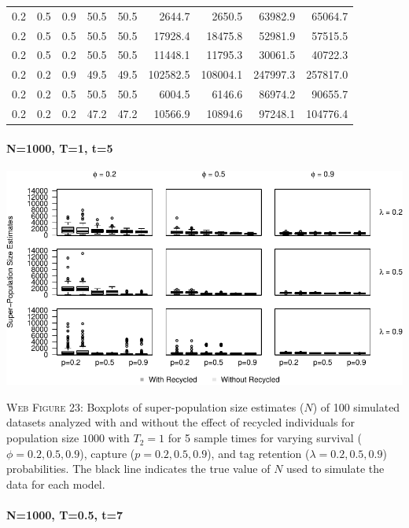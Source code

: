 \documentclass[]{article}
\let\oldparagraph\paragraph
\renewcommand{\paragraph}[1]{\oldparagraph{#1}\mbox{}}
\begin{document}
\begin{table}[ht]
{\begin{tabular}{rrrrrrrrr}
  0.2 & 0.5 & 0.9 & 50.5 & 50.5 & 2644.7 & 2650.5 & 63982.9 & 65064.7 \\ 
  0.2 & 0.5 & 0.5 & 50.5 & 50.5 & 17928.4 & 18475.8 & 52981.9 & 57515.5 \\ 
  0.2 & 0.5 & 0.2 & 50.5 & 50.5 & 11448.1 & 11795.3 & 30061.5 & 40722.3 \\ 
  0.2 & 0.2 & 0.9 & 49.5 & 49.5 & 102582.5 & 108004.1 & 247997.3 & 257817.0 \\ 
  0.2 & 0.2 & 0.5 & 50.5 & 50.5 & 6004.5 & 6146.6 & 86974.2 & 90655.7 \\ 
  0.2 & 0.2 & 0.2 & 47.2 & 47.2 & 10566.9 & 10894.6 & 97248.1 & 104776.4 \\ 
   \hline
\end{tabular}
}
\endgroup
\end{table}

\newpage

\paragraph{N=1000, T=1, t=5}\label{n1000-t1-t5-3}

\includegraphics{Appendix_BW_files/figure-latex/figure23_superN_GJSTL5-1.pdf}

\textsc{Web Figure 23:} Boxplots of super-population size estimates
(\(N\)) of 100 simulated datasets analyzed with and without the effect
of recycled individuals for population size \(1000\) with \(T_2=1\) for
5 sample times for varying survival (\(\phi=0.2,0.5,0.9\)), capture
(\(p=0.2,0.5,0.9\)), and tag retention (\(\lambda=0.2,0.5,0.9\))
probabilities. The black line indicates the true value of \(N\) used to
simulate the data for each model.

\paragraph{N=1000, T=0.5, t=7}\label{n1000-t0.5-t7}
\end{document}

